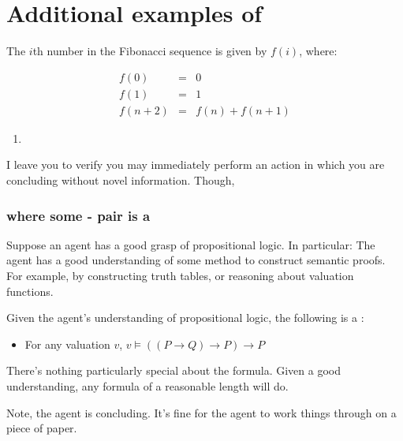 \chapter{Additional examples of }
\label{cha:addit-exampl-fcs1}

\begin{note}
    \begin{scenario}%
    \label{scen:fc:fib}%
    The \(i\)th number in the Fibonacci sequence is given by \(f(i)\), where:

    \[
      \begin{array}{rcl}
        f(0) &=& 0 \\
        f(1) &=& 1 \\
        f(n + 2) &=& f(n) + f(n + 1)
      \end{array}
    \]
  \end{scenario}

  \begin{enumerate}[label=C\thescenarioCounter., ref=(C\thescenarioCounter)]
  \item
    \label{scen:fc:fib:c}
  \end{enumerate}
  I leave you to verify you may immediately perform an action in which you are concluding  without novel information.
  Though, 
\end{note}

\subsection{ where some - pair is a \fc{}}

\begin{note}
  \begin{scenario}
    \label{illu:sketch:prop-logic}
    Suppose an agent has a good grasp of propositional logic.
    In particular:
    The agent has a good understanding of some method to construct semantic proofs.
    For example, by constructing truth tables, or reasoning about valuation functions.
  \end{scenario}

  Given the agent's understanding of propositional logic, the following is a \fc{}:
  \begin{itemize}
  \item
    For any valuation \(v\), \(v \vDash ((P \rightarrow Q) \rightarrow P) \rightarrow P \)
  \end{itemize}

  There's nothing particularly special about the formula.
  Given a good understanding, any formula of a reasonable length will do.

  Note, the agent is concluding.
  It's fine for the agent to work things through on a piece of paper.
\end{note}


